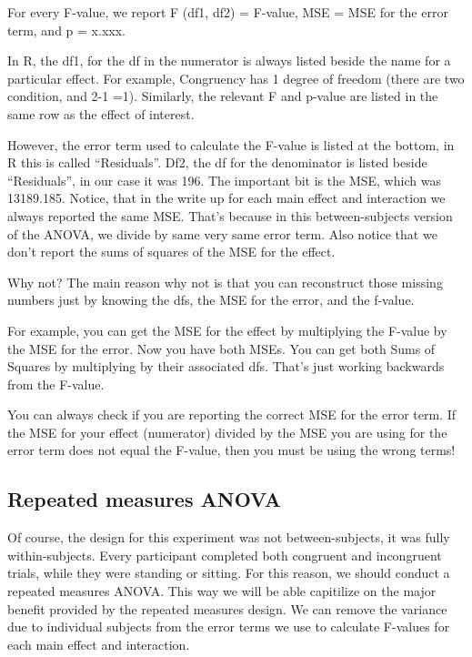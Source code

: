 \documentclass[]{book}
\theoremstyle{definition}
\theoremstyle{definition}
\theoremstyle{definition}
\theoremstyle{remark}
\begin{document}
For every F-value, we report F (df1, df2) = F-value, MSE = MSE for the
error term, and p = x.xxx.

In R, the df1, for the df in the numerator is always listed beside the
name for a particular effect. For example, Congruency has 1 degree of
freedom (there are two condition, and 2-1 =1). Similarly, the relevant F
and p-value are listed in the same row as the effect of interest.

However, the error term used to calculate the F-value is listed at the
bottom, in R this is called ``Residuals''. Df2, the df for the
denominator is listed beside ``Residuals'', in our case it was 196. The
important bit is the MSE, which was 13189.185. Notice, that in the write
up for each main effect and interaction we always reported the same MSE.
That's because in this between-subjects version of the ANOVA, we divide
by same very same error term. Also notice that we don't report the sums
of squares of the MSE for the effect.

Why not? The main reason why not is that you can reconstruct those
missing numbers just by knowing the dfs, the MSE for the error, and the
f-value.

For example, you can get the MSE for the effect by multiplying the
F-value by the MSE for the error. Now you have both MSEs. You can get
both Sums of Squares by multiplying by their associated dfs. That's just
working backwards from the F-value.

You can always check if you are reporting the correct MSE for the error
term. If the MSE for your effect (numerator) divided by the MSE you are
using for the error term does not equal the F-value, then you must be
using the wrong terms!

\subsection{Repeated measures ANOVA}\label{repeated-measures-anova}

Of course, the design for this experiment was not between-subjects, it
was fully within-subjects. Every participant completed both congruent
and incongruent trials, while they were standing or sitting. For this
reason, we should conduct a repeated measures ANOVA. This way we will be
able capitilize on the major benefit provided by the repeated measures
design. We can remove the variance due to individual subjects from the
error terms we use to calculate F-values for each main effect and
interaction.
\end{document}
